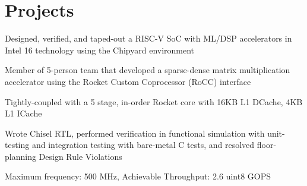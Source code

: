 \documentclass[]{deedy-resume-openfont}
\begin{document}
\pagebreak

\section{Projects}

\begin{tightemize}
\item Designed, verified, and taped-out a RISC-V SoC with ML/DSP accelerators in Intel 16 technology using the Chipyard environment 
\item Member of 5-person team that developed a sparse-dense matrix multiplication accelerator using the Rocket Custom Coprocessor (RoCC) interface
\item Tightly-coupled with a 5 stage, in-order Rocket core with 16KB L1 DCache, 4KB L1 ICache
\item Wrote Chisel RTL, performed verification in functional simulation with unit-testing and integration testing with bare-metal C tests, and resolved floor-planning Design Rule Violations
\item Maximum frequency: 500 MHz, Achievable Throughput: 2.6 uint8 GOPS
\end{tightemize}
\sectionsep



\end{document}
